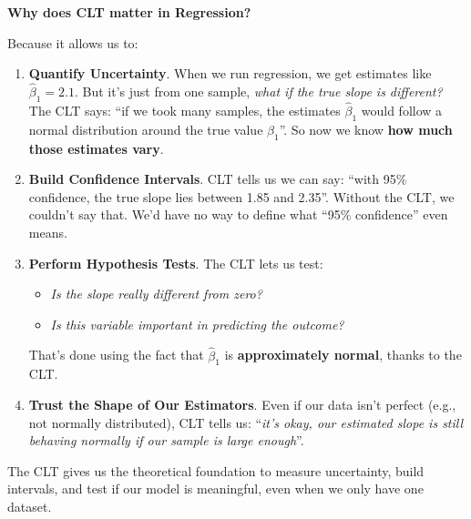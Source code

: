 \highspace
\begin{flushleft}
    \textcolor{Green3}{ \textbf{Why does CLT matter in Regression?}}
\end{flushleft}
Because it allows us to:
\begin{enumerate}
    \item \textcolor{Green3}{\textbf{Quantify Uncertainty}}. When we run regression, we get estimates like $\hat{\beta}_1 = 2.1$. But it's just from one sample, \emph{what if the true slope is different?} The CLT says: ``if we took many samples, the estimates $\hat{\beta}_1$ would follow a normal distribution around the true value $\beta_1$''. So now we know \textbf{how much those estimates vary}.

    \item \textcolor{Green3}{\textbf{Build Confidence Intervals}}. CLT tells us we can say: ``with 95\% confidence, the true slope lies between 1.85 and 2.35''. Without the CLT, we couldn't say that. We'd have no way to define what ``95\% confidence'' even means.
    
    \item \textcolor{Green3}{\textbf{Perform Hypothesis Tests}}. The CLT lets us test:
    \begin{itemize}
        \item \emph{Is the slope really different from zero?}
        \item \emph{Is this variable important in predicting the outcome?}
    \end{itemize}
    That's done using the fact that $\hat{\beta}_1$ is \textbf{approximately normal}, thanks to the CLT.
    
    \item \textcolor{Green3}{\textbf{Trust the Shape of Our Estimators}}. Even if our data isn't perfect (e.g., not normally distributed), CLT tells us: ``\emph{it's okay, our estimated slope is still behaving normally if our sample is large enough}''.
\end{enumerate}
The CLT gives us the theoretical foundation to measure uncertainty, build intervals, and test if our model is meaningful, even when we only have one dataset.